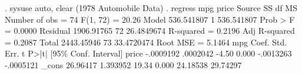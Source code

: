 . sysuse auto, clear
(1978 Automobile Data)
{\smallskip}
. regress mpg price
{\smallskip}
      Source {\VBAR}       SS           df       MS      Number of obs   =        74
   F(1, 72)        =     20.26
       Model {\VBAR}  536.541807         1  536.541807   Prob > F        =    0.0000
    Residual {\VBAR}  1906.91765        72  26.4849674   R-squared       =    0.2196
   Adj R-squared   =    0.2087
       Total {\VBAR}  2443.45946        73  33.4720474   Root MSE        =    5.1464
{\smallskip}
         mpg {\VBAR}      Coef.   Std. Err.      t    P>|t|     [95\% Conf. Interval]
       price {\VBAR}  -.0009192   .0002042    -4.50   0.000    -.0013263   -.0005121
       _cons {\VBAR}   26.96417   1.393952    19.34   0.000     24.18538    29.74297
